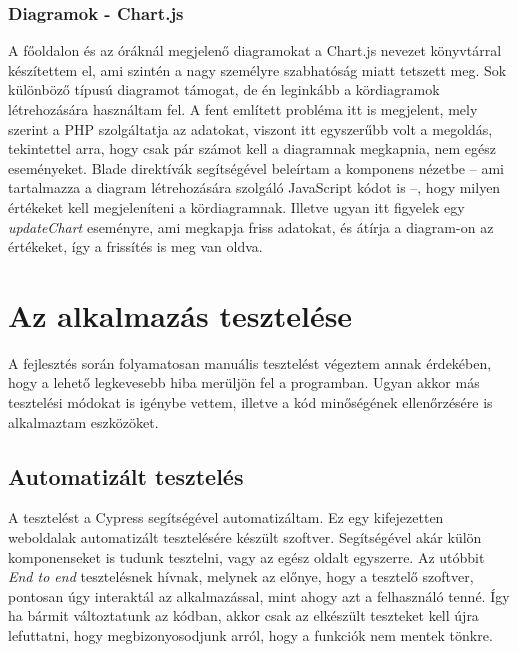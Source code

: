 \documentclass[
]{thesis-ekf}
\theoremstyle{definition}
\theoremstyle{remark}
\begin{document}


\subsection{Diagramok - Chart.js}

A főoldalon és az óráknál megjelenő diagramokat a Chart.js\cite{chartjs} nevezet könyvtárral készítettem el, ami szintén a nagy személyre szabhatóság  miatt tetszett meg. Sok különböző típusú diagramot támogat, de én leginkább a kördiagramok létrehozására használtam fel. A fent említett probléma itt is megjelent, mely szerint a PHP szolgáltatja az adatokat, viszont itt egyszerűbb volt a megoldás, tekintettel arra, hogy csak pár számot kell a diagramnak megkapnia, nem egész eseményeket. Blade direktívák segítségével beleírtam a komponens nézetbe -- ami tartalmazza a diagram létrehozására szolgáló JavaScript kódot is --, hogy milyen értékeket kell megjeleníteni a kördiagramnak. Illetve ugyan itt figyelek egy \emph{updateChart} eseményre, ami megkapja friss adatokat, és átírja  a diagram-on az értékeket, így a frissítés is meg van oldva.



\chapter{Az alkalmazás tesztelése}
\label{testing}

A fejlesztés során folyamatosan manuális tesztelést végeztem annak érdekében, hogy a lehető legkevesebb hiba merüljön fel a programban. Ugyan akkor más tesztelési módokat is igénybe vettem, illetve a kód minőségének ellenőrzésére is alkalmaztam eszközöket.

\section{Automatizált tesztelés}

A tesztelést a Cypress\cite{cypress} segítségével automatizáltam. Ez egy kifejezetten weboldalak automatizált tesztelésére készült szoftver. Segítségével akár külön komponenseket is tudunk tesztelni, vagy az egész oldalt egyszerre. Az utóbbit \emph{End to end} tesztelésnek hívnak, melynek az előnye, hogy a tesztelő szoftver, pontosan úgy interaktál az alkalmazással, mint ahogy azt a felhasználó tenné. Így ha bármit változtatunk az  kódban, akkor csak az elkészült teszteket kell újra lefuttatni, hogy megbizonyosodjunk arról, hogy a funkciók nem mentek tönkre. \cite{e2e}
\end{document}

